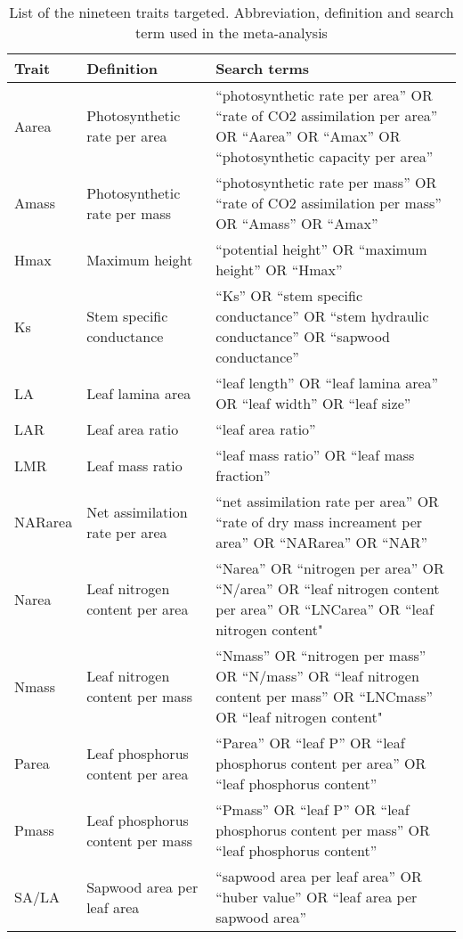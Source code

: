 \documentclass[a4paper,11pt]{article}
\begin{document}
\begin{appendices}
\begin{table}[h!]
\centering
\caption{List of the nineteen traits targeted. Abbreviation,
definition and search term used in the meta-analysis}
\label{tab:lit_search}
\vspace{0.5cm}
{\footnotesize
\begin{tabular}{p{3cm}p{3cm}p{8cm}}
  \hline
Trait & Definition & Search terms \\
  \hline
Aarea & Photosynthetic rate per area & ``photosynthetic rate per area'' OR ``rate of CO2 assimilation per area'' OR ``Aarea'' OR ``Amax'' OR ``photosynthetic capacity per area'' \\
  Amass & Photosynthetic rate per mass & ``photosynthetic rate per mass'' OR ``rate of CO2 assimilation per mass'' OR ``Amass'' OR ``Amax'' \\
  Hmax & Maximum height & ``potential height'' OR ``maximum height'' OR ``Hmax'' \\
  Ks & Stem specific conductance & ``Ks'' OR ``stem specific conductance'' OR ``stem hydraulic conductance'' OR ``sapwood conductance'' \\
  LA & Leaf lamina area & ``leaf length'' OR ``leaf lamina area'' OR ``leaf width'' OR ``leaf size'' \\
  LAR & Leaf area ratio & ``leaf area ratio'' \\
  LMR & Leaf mass ratio & ``leaf mass ratio'' OR ``leaf mass fraction'' \\
  NARarea & Net assimilation rate per area &  ``net assimilation rate per area'' OR ``rate of dry mass increament per area'' OR ``NARarea'' OR ``NAR'' \\
  Narea & Leaf nitrogen content per area & ``Narea'' OR ``nitrogen per area'' OR ``N/area'' OR ``leaf nitrogen content per area'' OR ``LNCarea'' OR ``leaf nitrogen content" \\
  Nmass & Leaf nitrogen content per mass & ``Nmass'' OR ``nitrogen per mass'' OR ``N/mass'' OR ``leaf nitrogen content per mass'' OR ``LNCmass'' OR ``leaf nitrogen content" \\
  Parea & Leaf phosphorus content per area & ``Parea'' OR ``leaf P'' OR  ``leaf phosphorus content per area''  OR ``leaf phosphorus content'' \\
  Pmass & Leaf phosphorus content per mass & ``Pmass'' OR ``leaf P'' OR  ``leaf phosphorus content per mass'' OR ``leaf phosphorus content'' \\
  SA/LA & Sapwood area per leaf area & ``sapwood area per leaf area'' OR ``huber value'' OR ``leaf area per sapwood area'' \\

\end{tabular}}
\end{table}
\end{appendices}
\end{document}
